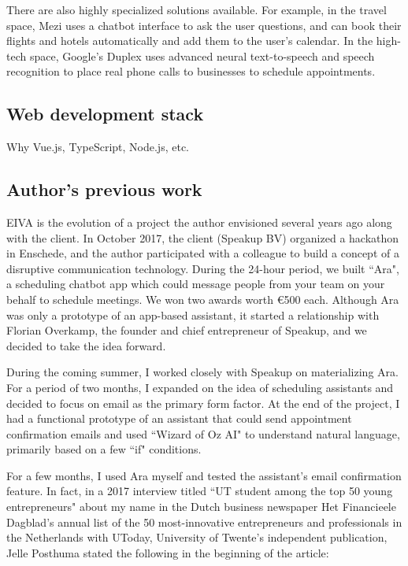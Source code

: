 \documentclass{article}
\begin{document}
There are also highly specialized solutions available. For example, in the travel space, Mezi uses a chatbot interface to ask the user questions, and can book their flights and hotels automatically and add them to the user's calendar. In the high-tech space, Google's Duplex uses advanced neural text-to-speech and speech recognition to place real phone calls to businesses to schedule appointments.

\subsection{Web development stack}

Why Vue.js, TypeScript, Node.js, etc.

\subsection{Author's previous work}

EIVA is the evolution of a project the author envisioned several years ago along with the client. In October 2017, the client (Speakup BV) organized a hackathon in Enschede, and the author participated with a colleague to build a concept of a disruptive communication technology. During the 24-hour period, we built ``Ara", a scheduling chatbot app which could message people from your team on your behalf to schedule meetings. We won two awards worth €500 each. Although Ara was only a prototype of an app-based assistant, it started a relationship with Florian Overkamp, the founder and chief entrepreneur of Speakup, and we decided to take the idea forward.

During the coming summer, I worked closely with Speakup on materializing Ara. For a period of two months, I expanded on the idea of scheduling assistants and decided to focus on email as the primary form factor. At the end of the project, I had a functional prototype of an assistant that could send appointment confirmation emails and used ``Wizard of Oz AI" to understand natural language, primarily based on a few ``if" conditions.

For a few months, I used Ara myself and tested the assistant's email confirmation feature. In fact, in a 2017 interview titled ``UT student among the top 50 young entrepreneurs" about my name in the Dutch business newspaper Het Financieele Dagblad's annual list of the 50 most-innovative entrepreneurs and professionals in the Netherlands with UToday, University of Twente's independent publication, Jelle Posthuma stated the following in the beginning of the article:
\end{document}
